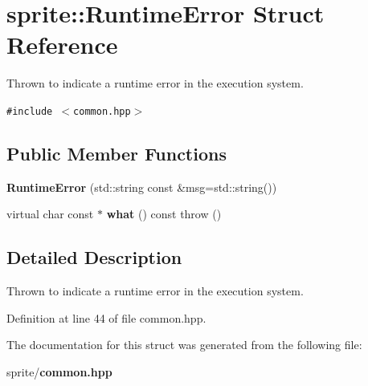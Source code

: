 \section{sprite::Runtime\-Error Struct Reference}
\label{structsprite_1_1RuntimeError}
Thrown to indicate a runtime error in the execution system.  


{\tt \#include $<$common.hpp$>$}

\subsection*{Public Member Functions}
\begin{CompactItemize}
\item 
{\bf Runtime\-Error} (std::string const \&msg=std::string())\label{structsprite_1_1RuntimeError_a0}

\item 
virtual char const $\ast$ {\bf what} () const   throw ()\label{structsprite_1_1RuntimeError_a1}

\end{CompactItemize}


\subsection{Detailed Description}
Thrown to indicate a runtime error in the execution system. 



Definition at line 44 of file common.hpp.

The documentation for this struct was generated from the following file:\begin{CompactItemize}
\item 
sprite/{\bf common.hpp}\end{CompactItemize}
